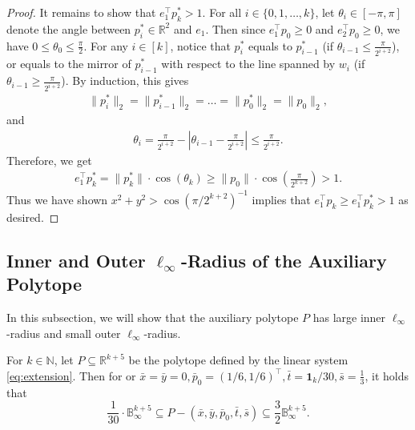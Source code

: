\documentclass{theoretics}
\newcommand{\R}{\mathbb R}
\newcommand{\N}{\mathbb N}
\newcommand{\T}{\top}
\renewcommand{\subset}{\subseteq}
\begin{document}
\begin{proof}
It remains to show that $e_1^\top p_k^* > 1$.
For all $i \in \{0, 1, \ldots, k\}$, let $\theta_i \in [-\pi, \pi]$ denote the angle between $p_i^* \in \R^2$ and $e_1$. Then since $e_1^\top p_0 \geq 0$ and $e_2^\top p_0 \geq 0$, we have $0 \leq \theta_0 \leq \frac{\pi}{2}$.
For any $i \in [k]$, notice that $p_i^*$ equals to $p_{i-1}^*$ (if $\theta_{i-1} \leq \frac{\pi}{2^{i+2}}$), or equals to the mirror of $p_{i-1}^*$ with respect to the line spanned by $w_i$ (if $\theta_{i-1} \geq \frac{\pi}{2^{i+2}}$). By induction, this gives 
\begin{align*}
    \|p_i^*\|_2 = \|p_{i-1}^*\|_2 = \ldots = \|p_0^*\|_2 = \|p_0\|_2,
\end{align*}
and
\begin{align*}
    \theta_{i} = \frac{\pi}{2^{i+2}} - |\theta_{i-1} - \frac{\pi}{2^{i+2}}| \leq \frac{\pi}{2^{i+2}}.
\end{align*}
Therefore, we get
\begin{align*}
    e_1^\top p_k^* = \|p_k^*\| \cdot \cos(\theta_k) \geq \|p_0\| \cdot \cos\left(\frac{\pi}{2^{k + 2}}\right) > 1.
\end{align*}
Thus we have shown $x^2 + y^2 > \cos(\pi/2^{k+2})^{-1}$ implies that $e_1^\T p_k \geq e_1^\T p_k^* > 1$
as desired.
\end{proof}



\subsection{Inner and Outer \texorpdfstring{$\ell_{\infty}$}{l\_infty}-Radius of the Auxiliary Polytope}\label{sec:lb-radius-P}

In this subsection, we will show that the auxiliary polytope $P$ has large inner $\ell_\infty$-radius and small outer $\ell_\infty$-radius.

\begin{lemma}\label{lem:lb-radius-P}
For $k \in \N$, let $P \subset \R^{k+5}$ be the polytope defined by the linear system \eqref{eq:extension}.
Then for or $\bar x = \bar y = 0, \bar{p}_0 = (1/6,1/6)^\top, \bar t  = \mathbf{1}_{k}/30, \bar{s} = \frac{1}{3}$, it holds that
\[
    \frac{1}{30}\cdot \mathbb{B}_\infty^{k+5} \subset P - (\bar x, \bar y, \bar{p}_0, \bar t, \bar{s}) \subset \frac 3 2 \mathbb{B}_\infty^{k+5}.
\]
\end{lemma}
\end{document}
